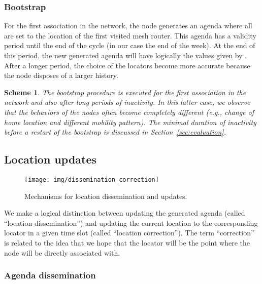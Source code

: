 \documentclass[a4paper]{sig-alternate-10pt}
\newtheorem{scheme}{Scheme}
\begin{document}
\subsubsection{Bootstrap}
\label{subsubsec:bootstrap}

For the first association in the network, the node  generates an
agenda  where all  are set to the location of the first
visited mesh router. This agenda has a validity period until the end
of the cycle (in our case the end of the week). At the end of this 
period, the new generated agenda will have logically the values 
given by . After a longer period, the choice of the locators 
become more accurate because the node disposes of a larger history.

\begin{scheme}
The bootstrap procedure is executed for the first association in the
network and also after long periods of inactivity. In this latter
case, we observe that the behaviors of the nodes often become
completely different (e.g., change of home location and different
mobility pattern). The minimal duration of inactivity before a
restart of the bootstrap is discussed in
Section~\ref{sec:evaluation}.
\end{scheme}

\subsection{Location updates}

\begin{figure}
 \centering
 \texttt{[image: img/dissemination\_correction]}
 \caption{Mechanisms for location dissemination and updates.}
\label{fig:dissemination}
\end{figure}

We make a logical distinction between updating the generated agenda
(called ``location dissemination'') and updating the current
location to the corresponding locator in a given time slot (called
``location correction''). The term ``correction'' is related to the
idea that we hope that the locator will be the point where the node
will be directly associated with.

\subsubsection{Agenda dissemination}
\end{document}
